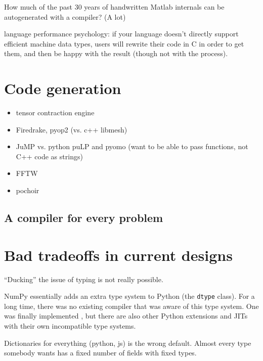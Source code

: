 {How much of the past 30 years of handwritten Matlab internals can
be autogenerated with a compiler? (A lot)

language performance psychology:
if your language doesn't directly support efficient machine data types,
users will rewrite their code in C in order to get them, and then be
happy with the result (though not with the process).


\section{Code generation}

\begin{itemize}
\item tensor contraction engine
\item Firedrake, pyop2 (vs. c++ libmesh)
\item JuMP vs. python puLP and pyomo
  (want to be able to pass functions, not C++ code as strings)
\item FFTW
\item pochoir
\end{itemize}

\subsection{A compiler for every problem}

\cite{hopepython}


\section{Bad tradeoffs in current designs}

``Ducking'' the issue of typing is not really possible.

NumPy essentially adds an extra type system to Python (the
\texttt{dtype} class). For a long time, there was no existing
compiler that was aware of this type system. One was finally
implemented \cite{oliphant2012numba}, but there are also
other Python extensions and JITs with their own incompatible
type systems.



Dictionaries for everything (python, js) is the wrong default. Almost every
type somebody wants has a fixed number of fields with fixed types.

}
